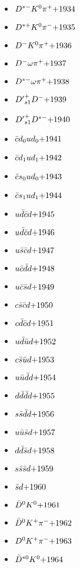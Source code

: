 \begin{multicols}{3}
\begin{itemize}
 \item $ D^{*-} K^{0} \pi^{+} \hfill{+1934}$
 \item $ D^{*+} K^{0} \pi^{-} \hfill{+1935}$
 \item $ D^{-} K^{0} \pi^{+} \hfill{+1936}$
 \item $ D^{-} \omega \pi^{+} \hfill{+1937}$
 \item $ D^{*-} \omega \pi^{+} \hfill{+1938}$
 \item $ {D^{\prime}}_{s1}^{+} D^{-} \hfill{+1939}$
 \item $ {D^{\prime}}_{s1}^{+} D^{*-} \hfill{+1940}$
 \item $ \bar{c}d_{0} ud_{0} \hfill{+1941}$
 \item $ \bar{c}d_{1} ud_{1} \hfill{+1942}$
 \item $ \bar{c}s_{0} ud_{0} \hfill{+1943}$
 \item $ \bar{c}s_{1} ud_{1} \hfill{+1944}$
 \item $ u \bar{d} \bar{c} d \hfill{+1945}$
 \item $ u \bar{d} \bar{c} d \hfill{+1946}$
 \item $ u \bar{s} \bar{c} d \hfill{+1947}$
 \item $ u \bar{c} \bar{d} d \hfill{+1948}$
 \item $ u \bar{c} \bar{s} d \hfill{+1949}$
 \item $ c \bar{s} \bar{c} d \hfill{+1950}$
 \item $ c \bar{d} \bar{c} d \hfill{+1951}$
 \item $ u \bar{d} \bar{u} d \hfill{+1952}$
 \item $ c \bar{s} \bar{u} d \hfill{+1953}$
 \item $ u \bar{u} \bar{d} d \hfill{+1954}$
 \item $ d \bar{d} \bar{d} d \hfill{+1955}$
 \item $ s \bar{s} \bar{d} d \hfill{+1956}$
 \item $ u \bar{u} \bar{s} d \hfill{+1957}$
 \item $ d \bar{d} \bar{s} d \hfill{+1958}$
 \item $ s \bar{s} \bar{s} d \hfill{+1959}$
 \item $ \bar{s} d \hfill{+1960}$
 \item $ \bar{D}^{0} K^{0} \hfill{+1961}$
 \item $ \bar{D}^{0} K^{+} \pi^{-} \hfill{+1962}$
 \item $ D^{0} K^{+} \pi^{-} \hfill{+1963}$
 \item $ \bar{D}^{*0} K^{0} \hfill{+1964}$

\end{itemize}
\end{multicols}
